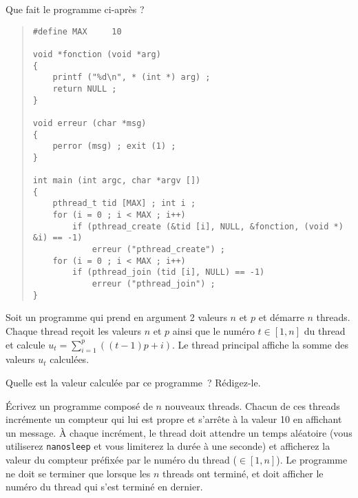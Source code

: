 %


% 

\question	%

Que fait le programme ci-après ?

\begin {quote}
\begin {verbatim}
#define MAX     10

void *fonction (void *arg)
{
    printf ("%
    return NULL ;
}

void erreur (char *msg)
{
    perror (msg) ; exit (1) ;
}

int main (int argc, char *argv [])
{
    pthread_t tid [MAX] ; int i ;
    for (i = 0 ; i < MAX ; i++)
        if (pthread_create (&tid [i], NULL, &fonction, (void *) &i) == -1)
            erreur ("pthread_create") ;
    for (i = 0 ; i < MAX ; i++)
        if (pthread_join (tid [i], NULL) == -1)
            erreur ("pthread_join") ;
}
\end{verbatim}
\end {quote}


\question	%

Soit un programme qui prend en argument 2 valeurs $n$ et $p$ et démarre
$n$ threads.  Chaque thread reçoit les valeurs $n$ et $p$ ainsi que
le numéro $t \in [1,n]$ du thread et calcule $u_t = \sum_{i=1}^{p}
((t-1)p + i)$. Le thread principal affiche la somme des valeurs $u_t$
calculées.

Quelle est la valeur calculée par ce programme~? Rédigez-le.



\question	%

Écrivez un programme composé de $n$ nouveaux threads. Chacun de ces
threads incrémente un compteur qui lui est propre et s'arrête à
la valeur 10 en affichant un message. À chaque incrément, le thread
doit attendre un temps aléatoire (vous utiliserez \texttt {nanosleep}
et vous limiterez la durée à une seconde) et afficherez la valeur
du compteur préfixée par le numéro du thread ($\in [1,n]$). Le
programme ne doit se terminer que lorsque les $n$ threads ont terminé,
et doit afficher le numéro du thread qui s'est terminé en dernier.


